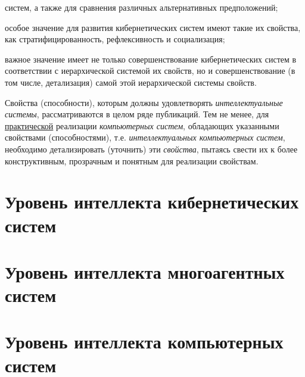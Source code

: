 {\begin{scnitemize}
	систем, а также для сравнения различных альтернативных предположений;
	\item особое значение для развития кибернетических систем имеют такие их свойства, как стратифицированность,
	рефлексивность и социализация;
	\item важное значение имеет не только совершенствование кибернетических систем в соответствии с иерархической
	системой их свойств, но и совершенствование (в том числе, детализация) самой этой иерархической системы свойств.
\end{scnitemize}
Свойства (способности), которым должны удовлетворять \textit{интеллектуальные системы}, рассматриваются в целом ряде
	публикаций. Тем не менее, для \uline{практической} реализации \textit{компьютерных систем}, обладающих указанными
	свойствами (способностями), т.е. \textit{интеллектуальных компьютерных систем}, необходимо детализировать
	(уточнить) эти \textit{свойства}, пытаясь свести их к более конструктивным, прозрачным и понятным для реализации
	свойствам.
}

\section{Уровень интеллекта кибернетических систем}
\section{Уровень интеллекта многоагентных систем}
\label{section_mas}

\section{Уровень интеллекта компьютерных систем}

%
